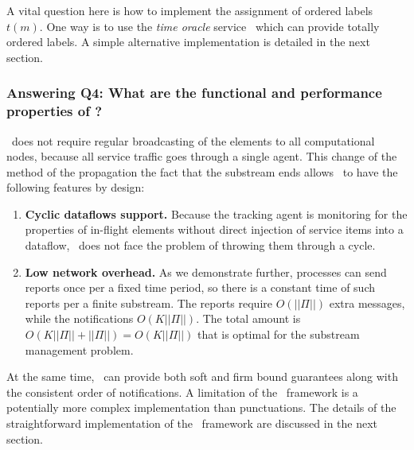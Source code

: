 A vital question here is how to implement the assignment of ordered labels $t(m)$. One way is to use the {\em time oracle} service~\cite{10.14778/3055330.3055335} which can provide totally ordered labels. A simple alternative implementation is detailed in the next section. 

\subsubsection{Answering Q4: What are the functional and performance properties of \tracker?}

\tracker\ does not require regular broadcasting of the elements to all computational nodes, because all service traffic goes through a single agent. This change of the method of the propagation the fact that the substream ends allows \tracker\ to have the following features by design:

\begin{enumerate}
    \item {\bf Cyclic dataflows support.} Because the tracking agent is monitoring for the properties of in-flight elements without direct injection of service items into a dataflow, \tracker\ does not face the problem of throwing them through a cycle.
    \item {\bf Low network overhead.} As we demonstrate further, processes can send reports once per a fixed time period, so there is a constant time of such reports per a finite substream. The reports require $O(||\Pi||)$ extra messages, while the notifications $O(K||\Pi||)$. The total amount is $O(K||\Pi|| + ||\Pi||) = O(K||\Pi||)$ that is optimal for the substream management problem. 
\end{enumerate}

At the same time, \tracker\ can provide both soft and firm bound guarantees along with the consistent order of notifications. A limitation of the \tracker\ framework is a potentially more complex implementation than punctuations. The details of the straightforward implementation of the \tracker\ framework are discussed in the next section.
